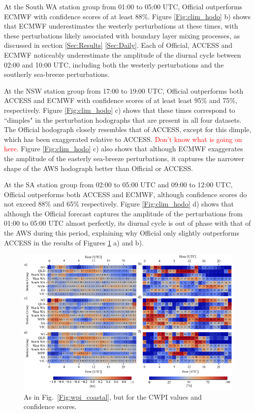 \documentclass[twocol]{ametsoc}
\begin{document}
At the South WA station group from 01:00 to 05:00 UTC, Official outperforms ECMWF with confidence scores of at least $88\%$. Figure \ref{Fig:clim_hodo} b) shows that ECMWF underestimates the westerly perturbations at these times, with these perturbations likely associated with boundary layer mixing processes, as discussed in section \ref{Sec:Results} \ref{Sec:Daily}. Each of Official, ACCESS and ECMWF noticeably underestimate the amplitude of the diurnal cycle between 02:00 and 10:00 UTC, including both the westerly perturbations and the southerly sea-breeze perturbations. 

At the NSW station group from 17:00 to 19:00 UTC, Official outperforms both ACCESS and ECMWF with confidence scores of at least least 95\% and 75\%, respectively. Figure \ref{Fig:clim_hodo} c) shows that these times correspond to ``dimples" in the perturbation hodographs that are present in all four datasets. The Official hodograph closely resembles that of ACCESS, except for this dimple, which has been exaggerated relative to ACCESS. \textcolor{red}{Don't know what is going on here.} Figure \ref{Fig:clim_hodo} c) also shows that although ECMWF exaggerates the amplitude of the easterly sea-breeze perturbations, it captures the narrower shape of the AWS hodograph better than Official or ACCESS.

At the SA station group from 02:00 to 05:00 UTC and 09:00 to 12:00 UTC, Official outperforms both ACCESS and ECMWF, although confidence scores do not exceed 88\% and 65\% respectively. Figure \ref{Fig:clim_hodo} d) shows that although the Official forecast captures the amplitude of the perturbations from 01:00 to 05:00 UTC almost perfectly, its diurnal cycle is out of phase with that of the AWS during this period, explaining why Official only slightly outperforms ACCESS in the results of Figures \ref{Fig:cwpi_coastal} a) and b).

\begin{figure}
\centering
\includegraphics[width=39pc]{cwpi_coastal.pdf}
\caption{As in Fig.~\ref{Fig:wpi_coastal}, but for the CWPI values and confidence scores.}
\label{Fig:cwpi_coastal}
\end{figure}
\end{document}
